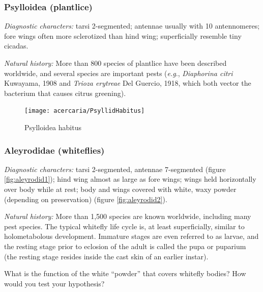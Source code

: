 \subsubsection{Psylloidea (plantlice)}
\noindent{}\textit{Diagnostic characters:} tarsi 2-segmented; antennae usually with 10 antennomeres; fore wings often more sclerotized than hind wing; superficially resemble tiny cicadas.\vspace{3mm}

\noindent{}\textit{Natural history:} More than 800 species of plantlice have been described worldwide, and several species are important pests (\textit{e.g}., \textit{Diaphorina citri} Kuwayama, 1908 and \textit{Trioza erytreae} Del Guercio, 1918, which both vector the bacterium that causes citrus greening).\vspace{3mm}

\begin{figure}[ht!]
 \centering
 \texttt{[image: acercaria/PsyllidHabitus]}
 \caption{Psylloidea habitus \citep[][Fig. 10d]{bhlpart17516}}
 \label{fig:psyllid}
\end{figure}

\subsubsection{Aleyrodidae (whiteflies)}
\noindent{}\textit{Diagnostic characters:} tarsi 2-segmented, antennae 7-segmented (figure \ref{fig:aleyrodid1}); hind wing almost as large as fore wings; wings held horizontally over body while at rest; body and wings covered with white, waxy powder (depending on preservation) (figure \ref{fig:aleyrodid2}).\vspace{3mm}

\noindent{}\textit{Natural history:} More than 1,500 species are known worldwide, including many pest species. The typical whitefly life cycle is, at least superficially, similar to holometabolous development. Immature stages are even referred to as larvae, and the resting stage prior to eclosion of the adult is called the pupa or puparium (the resting stage resides inside the cast skin of an earlier instar).\vspace{3mm}

\begin{theo}
{}What is the function of the white ``powder'' that covers whitefly bodies? How would you test your hypothesis?
\end{theo} 

